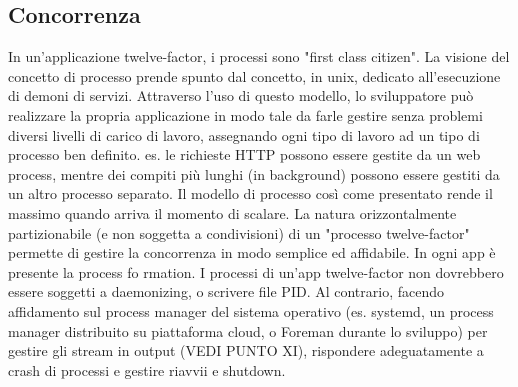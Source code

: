 \documentclass[PianoDiQualifica.tex]{subfiles}
\begin{document}
\subsection{Concorrenza}
In un'applicazione twelve-factor, i processi sono "first class citizen". La visione del concetto di processo prende spunto dal concetto, in unix, dedicato all'esecuzione di demoni di servizi. Attraverso l'uso di questo modello, lo sviluppatore può realizzare la propria applicazione in modo tale da farle gestire senza problemi diversi livelli di carico di lavoro, assegnando ogni tipo di lavoro ad un tipo di processo ben definito.
es. le richieste HTTP possono essere gestite da un web process, mentre dei compiti più lunghi (in background) possono essere gestiti da un altro processo separato.
Il modello di processo così come presentato rende il massimo quando arriva il momento di scalare. La natura orizzontalmente partizionabile (e non soggetta a condivisioni) di un "processo twelve-factor" permette di gestire la concorrenza in modo semplice ed affidabile. 
In ogni app è presente la process fo	rmation.
I processi di un'app twelve-factor non dovrebbero essere soggetti a daemonizing, o scrivere file PID. Al contrario, facendo affidamento sul process manager del sistema operativo (es. systemd, un process manager distribuito su piattaforma cloud, o Foreman durante lo sviluppo) per gestire gli stream in output (VEDI PUNTO XI), rispondere adeguatamente a crash di processi e gestire riavvii e shutdown.
\end{document}
